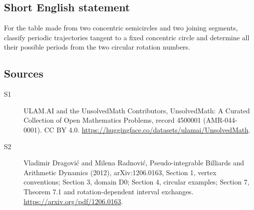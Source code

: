 \documentclass[11pt]{article}
\begin{document}
\subsection{Short English statement}
For the table made from two concentric semicircles and two joining segments, classify periodic trajectories tangent to a fixed concentric circle and determine all their possible periods from the two circular rotation numbers.
\subsection{Sources}
\begin{description}
\item[\hypertarget{source:4500001:1}{S1}] ULAM.AI and the UnsolvedMath Contributors, UnsolvedMath: A Curated Collection of Open Mathematics Problems, record 4500001 (AMR-044-0001). CC BY 4.0. \url{https://huggingface.co/datasets/ulamai/UnsolvedMath}.
\item[\hypertarget{source:4500001:2}{S2}] Vladimir Dragović and Milena Radnović, Pseudo-integrable Billiards and Arithmetic Dynamics (2012), arXiv:1206.0163, Section 1, vertex conventions; Section 3, domain D0; Section 4, circular examples; Section 7, Theorem 7.1 and rotation-dependent interval exchanges. \url{https://arxiv.org/pdf/1206.0163}.
\end{description}
\label{end:4500001}
\end{document}
